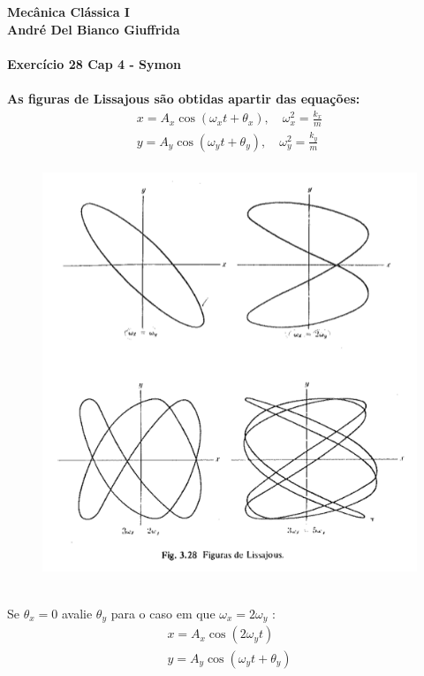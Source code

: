 \documentclass[a4paper,12pt]{exam}
\begin{document}
\begingroup 
	  \bf \Large Mecânica Clássica I\\
	  \indent \normalsize André Del Bianco Giuffrida
	\endgroup
	\\ \quad
	\\
	Exercício 28 Cap 4 - Symon
	\\ 
	\\
	As figuras de Lissajous são obtidas apartir das equações:\\
	\[
	 \begin{array}{ll}
	 x = A_x \cos{(\omega_x t + \theta_x)}, \quad \omega_x^2 =\frac{ k_x}{m}\\
	 y = A_y \cos{(\omega_y t + \theta_y)}, \quad \omega_y^2 =\frac{ k_y}{m}\\
	\end{array}
	\]
		\begin{figure}[wlh]
			\centering
			\includegraphics[scale=0.4]{Lissajous.png}
		\end{figure}
	\\
	Se $\theta_x = 0$ avalie $\theta_y$ para o caso em que $\omega_x = 2\omega_y$ :
	\[
	 \begin{array}{ll}
	 x = A_x \cos{(2\omega_y t )}\\
	 y = A_y \cos{(\omega_y t + \theta_y)}\\
	\end{array}
	\]
\end{document}
